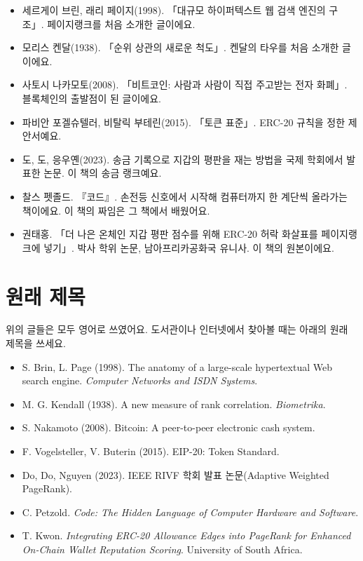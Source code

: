 \begin{itemize}\raggedright
\item 세르게이 브린, 래리 페이지(1998). 「대규모 하이퍼텍스트 웹 검색 엔진의 구조」. 페이지랭크를 처음 소개한 글이에요.
\item 모리스 켄달(1938). 「순위 상관의 새로운 척도」. 켄달의 타우를 처음 소개한 글이에요.
\item 사토시 나카모토(2008). 「비트코인: 사람과 사람이 직접 주고받는 전자 화폐」. 블록체인의 출발점이 된 글이에요.
\item 파비안 포겔슈텔러, 비탈릭 부테린(2015). 「토큰 표준」. ERC-20 규칙을 정한 제안서예요.
\item 도, 도, 응우옌(2023). 송금 기록으로 지갑의 평판을 재는 방법을 국제 학회에서 발표한 논문. 이 책의 송금 랭크예요.
\item 찰스 펫졸드. 『코드』. 손전등 신호에서 시작해 컴퓨터까지 한 계단씩 올라가는 책이에요. 이 책의 짜임은 그 책에서 배웠어요.
\item 권태홍. 「더 나은 온체인 지갑 평판 점수를 위해 ERC-20 허락 화살표를 페이지랭크에 넣기」. 박사 학위 논문, 남아프리카공화국 유니사. 이 책의 원본이에요.
\end{itemize}

\section{원래 제목}

위의 글들은 모두 영어로 쓰였어요. 도서관이나 인터넷에서 찾아볼 때는 아래의 원래 제목을 쓰세요.

{\small
\begin{itemize}\raggedright
\item S. Brin, L. Page (1998). The anatomy of a large-scale hypertextual Web search engine. \textit{Computer Networks and ISDN Systems}.
\item M. G. Kendall (1938). A new measure of rank correlation. \textit{Biometrika}.
\item S. Nakamoto (2008). Bitcoin: A peer-to-peer electronic cash system.
\item F. Vogelsteller, V. Buterin (2015). EIP-20: Token Standard.
\item Do, Do, Nguyen (2023). IEEE RIVF 학회 발표 논문(Adaptive Weighted PageRank).
\item C. Petzold. \textit{Code: The Hidden Language of Computer Hardware and Software}.
\item T. Kwon. \textit{Integrating ERC-20 Allowance Edges into PageRank for Enhanced On-Chain Wallet Reputation Scoring}. University of South Africa.
\end{itemize}
}
